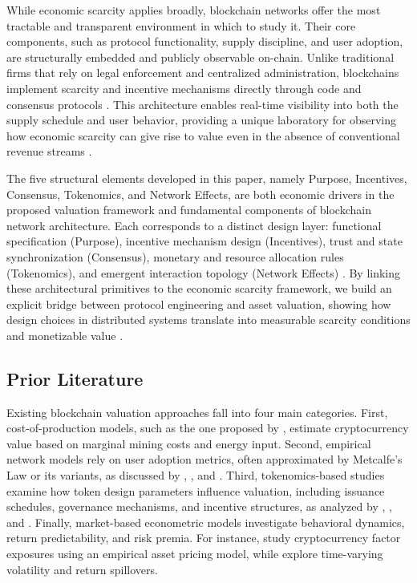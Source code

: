 \documentclass[12pt]{article}
\begin{document}
While economic scarcity applies broadly, blockchain networks offer the most tractable and transparent environment in which to study it. Their core components, such as protocol functionality, supply discipline, and user adoption, are structurally embedded and publicly observable on-chain. Unlike traditional firms that rely on legal enforcement and centralized administration, blockchains implement scarcity and incentive mechanisms directly through code and consensus protocols \citep{cong2019blockchain, cong2021tokenomics}. This architecture enables real-time visibility into both the supply schedule and user behavior, providing a unique laboratory for observing how economic scarcity can give rise to value even in the absence of conventional revenue streams \citep{nadler2020fair, urquhart2023future}.

The five structural elements developed in this paper, namely Purpose, Incentives, Consensus, Tokenomics, and Network Effects, are both economic drivers in the proposed valuation framework and fundamental components of blockchain network architecture. Each corresponds to a distinct design layer: functional specification (Purpose), incentive mechanism design (Incentives), trust and state synchronization (Consensus), monetary and resource allocation rules (Tokenomics), and emergent interaction topology (Network Effects) \citep{gans2019economics, catalini2020some, saleh2021blockchain, cong2021tokenomics}. By linking these architectural primitives to the economic scarcity framework, we build an explicit bridge between protocol engineering and asset valuation, showing how design choices in distributed systems translate into measurable scarcity conditions and monetizable value \citep{huberman2021monetizing, urquhart2023future, rao2023bittensor}.


\subsection{Prior Literature}

Existing blockchain valuation approaches fall into four main categories. First, cost-of-production models, such as the one proposed by \citet{hayes2015cost}, estimate cryptocurrency value based on marginal mining costs and energy input. Second, empirical network models rely on user adoption metrics, often approximated by Metcalfe’s Law or its variants, as discussed by \citet{GandalHalaburda2016}, \citet{Peterson2018}, and \citet{cong2019blockchain}. Third, tokenomics-based studies examine how token design parameters influence valuation, including issuance schedules, governance mechanisms, and incentive structures, as analyzed by \citet{cong2021tokenomics}, \citet{huberman2021monetizing}, and \citet{catalini2020some}. Finally, market-based econometric models investigate behavioral dynamics, return predictability, and risk premia. For instance, \citet{LiuTsyvinski2022} study cryptocurrency factor exposures using an empirical asset pricing model, while \citet{urquhart2022ethereum} explore time-varying volatility and return spillovers.
\end{document}
